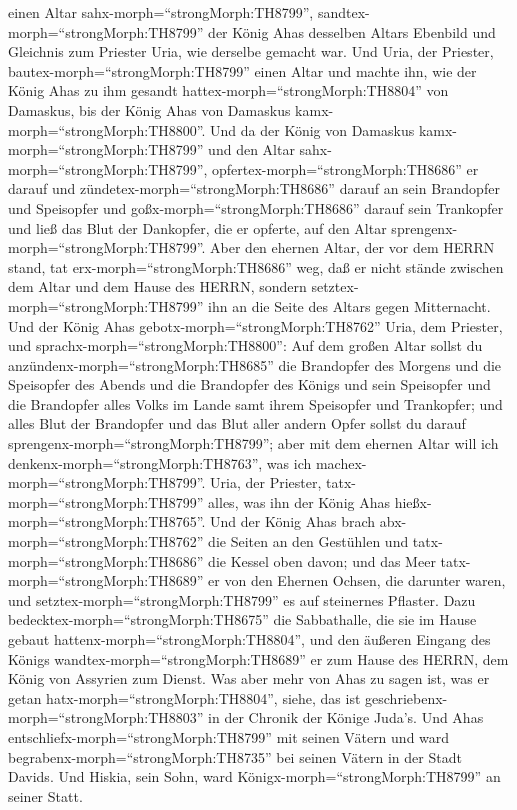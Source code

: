 einen Altar sahx-morph=``strongMorph:TH8799'',
sandtex-morph=``strongMorph:TH8799'' der König Ahas desselben Altars
Ebenbild und Gleichnis zum Priester Uria, wie derselbe gemacht war.
 Und Uria, der Priester,
bautex-morph=``strongMorph:TH8799'' einen Altar und machte ihn, wie der
König Ahas zu ihm gesandt hattex-morph=``strongMorph:TH8804'' von
Damaskus, bis der König Ahas von Damaskus
kamx-morph=``strongMorph:TH8800''.  Und da der König von
Damaskus kamx-morph=``strongMorph:TH8799'' und den Altar
sahx-morph=``strongMorph:TH8799'', opfertex-morph=``strongMorph:TH8686''
er darauf  und zündetex-morph=``strongMorph:TH8686'' darauf
an sein Brandopfer und Speisopfer und goßx-morph=``strongMorph:TH8686''
darauf sein Trankopfer und ließ das Blut der Dankopfer, die er opferte,
auf den Altar sprengenx-morph=``strongMorph:TH8799''.  Aber
den ehernen Altar, der vor dem HERRN stand, tat
erx-morph=``strongMorph:TH8686'' weg, daß er nicht stände zwischen dem
Altar und dem Hause des HERRN, sondern
setztex-morph=``strongMorph:TH8799'' ihn an die Seite des Altars gegen
Mitternacht.  Und der König Ahas
gebotx-morph=``strongMorph:TH8762'' Uria, dem Priester, und
sprachx-morph=``strongMorph:TH8800'': Auf dem großen Altar sollst du
anzündenx-morph=``strongMorph:TH8685'' die Brandopfer des Morgens und
die Speisopfer des Abends und die Brandopfer des Königs und sein
Speisopfer und die Brandopfer alles Volks im Lande samt ihrem Speisopfer
und Trankopfer; und alles Blut der Brandopfer und das Blut aller andern
Opfer sollst du darauf sprengenx-morph=``strongMorph:TH8799''; aber mit
dem ehernen Altar will ich denkenx-morph=``strongMorph:TH8763'', was ich
machex-morph=``strongMorph:TH8799''.  Uria, der Priester,
tatx-morph=``strongMorph:TH8799'' alles, was ihn der König Ahas
hießx-morph=``strongMorph:TH8765''.  Und der König Ahas
brach abx-morph=``strongMorph:TH8762'' die Seiten an den Gestühlen und
tatx-morph=``strongMorph:TH8686'' die Kessel oben davon; und das Meer
tatx-morph=``strongMorph:TH8689'' er von den Ehernen Ochsen, die
darunter waren, und setztex-morph=``strongMorph:TH8799'' es auf
steinernes Pflaster.  Dazu
bedecktex-morph=``strongMorph:TH8675'' die Sabbathalle, die sie im Hause
gebaut hattenx-morph=``strongMorph:TH8804'', und den äußeren Eingang des
Königs wandtex-morph=``strongMorph:TH8689'' er zum Hause des HERRN, dem
König von Assyrien zum Dienst.  Was aber mehr von Ahas zu
sagen ist, was er getan hatx-morph=``strongMorph:TH8804'', siehe, das
ist geschriebenx-morph=``strongMorph:TH8803'' in der Chronik der Könige
Juda's.  Und Ahas entschliefx-morph=``strongMorph:TH8799''
mit seinen Vätern und ward begrabenx-morph=``strongMorph:TH8735'' bei
seinen Vätern in der Stadt Davids. Und Hiskia, sein Sohn, ward
Königx-morph=``strongMorph:TH8799'' an seiner Statt.


